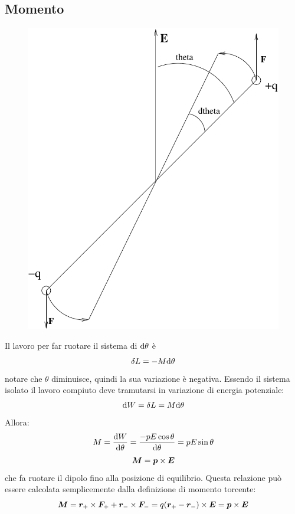 \subsection{Momento}
\begin{figure}[htbp]
\centering
\includegraphics[scale=0.5]{immagini/fisica2/dipolo_mom}
\end{figure}
Il lavoro per far ruotare il sistema di $\mathrm{d}\theta$ è 
\begin{equation*}\delta L=-M\mathrm{d}\theta\end{equation*}
notare che $\theta$ diminuisce, quindi la sua variazione è negativa. Essendo il sistema isolato il lavoro compiuto deve tramutarsi in variazione di energia potenziale:
\begin{equation*}\mathrm{d} W=\delta L=M\mathrm{d}\theta\end{equation*}
Allora:
\begin{equation*}M=\frac{\mathrm{d} W}{\mathrm{d}\theta}=\frac{-pE\cos\theta}{\mathrm{d}\theta}=pE\sin\theta\end{equation*}
\begin{equation*}\boldsymbol{M}=\boldsymbol{p}\times\boldsymbol{E}\end{equation*}
che fa ruotare il dipolo fino alla posizione di equilibrio. Questa relazione può essere calcolata semplicemente dalla definizione di momento torcente:
\begin{equation*}
 \boldsymbol{M} = \boldsymbol{r}_+\times \boldsymbol{F}_+ + \boldsymbol{r}_-\times\boldsymbol{F}_- = q(\boldsymbol{r}_+-\boldsymbol{r}_-)\times \boldsymbol{E}=\boldsymbol{p}\times\boldsymbol{E}
\end{equation*}

